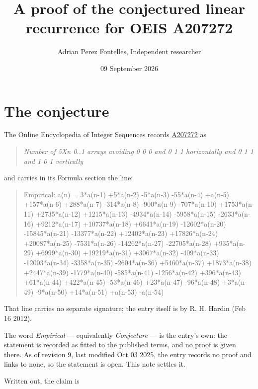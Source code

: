 \documentclass[11pt]{article}
\title{A proof of the conjectured linear recurrence for OEIS A207272}
\author{Adrian Perez Fontelles, Independent researcher}
\date{09 September 2026}
\theoremstyle{definition}
\begin{document}
\maketitle
\section{The conjecture}

The Online Encyclopedia of Integer Sequences records \href{https://oeis.org/A207272}{A207272} as

\begin{quote}\itshape Number of 5Xn 0..1 arrays avoiding 0 0 0 and 0 1 1 horizontally and 0 1 1 and 1 0 1 vertically\end{quote}

and carries in its Formula section the line:

\begin{quote}\ttfamily Empirical: a(n) = 3*a(n-1) +5*a(n-2) -5*a(n-3) -55*a(n-4) +a(n-5) +157*a(n-6) +288*a(n-7) -314*a(n-8) -900*a(n-9) -707*a(n-10) +1753*a(n-11) +2735*a(n-12) +1215*a(n-13) -4934*a(n-14) -5958*a(n-15) -2633*a(n-16) +9212*a(n-17) +10737*a(n-18) +6641*a(n-19) -12602*a(n-20) -15845*a(n-21) -13377*a(n-22) +12402*a(n-23) +17826*a(n-24) +20087*a(n-25) -7531*a(n-26) -14262*a(n-27) -22705*a(n-28) +935*a(n-29) +6999*a(n-30) +19219*a(n-31) +3067*a(n-32) -409*a(n-33) -12003*a(n-34) -3358*a(n-35) -2604*a(n-36) +5460*a(n-37) +1873*a(n-38) +2447*a(n-39) -1779*a(n-40) -585*a(n-41) -1256*a(n-42) +396*a(n-43) +61*a(n-44) +422*a(n-45) -53*a(n-46) +23*a(n-47) -96*a(n-48) +3*a(n-49) -9*a(n-50) +14*a(n-51) +a(n-53) -a(n-54)\end{quote}

That line carries no separate signature; the entry itself is by R. H. Hardin (Feb 16 2012).

The word {\itshape Empirical} --- equivalently {\itshape Conjecture} --- is the entry's own: the statement is recorded as fitted to the published terms, and no proof is given there. As of revision 9, last modified Oct 03 2025, the entry records no proof and links to none, so the statement is open. This note settles it.

Written out, the claim is
\end{document}
